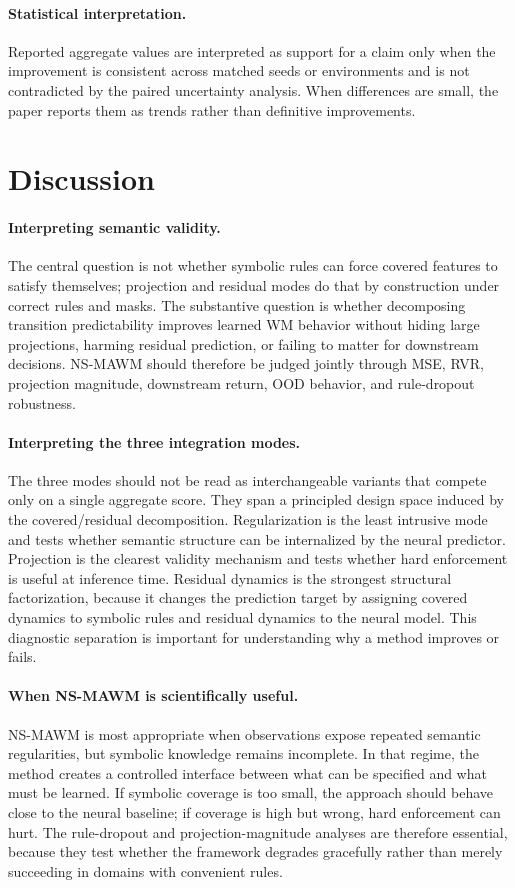 \documentclass{article}
\theoremstyle{plain}
\theoremstyle{definition}
\theoremstyle{remark}
\begin{document}
\paragraph{Statistical interpretation.}
Reported aggregate values are interpreted as support for a claim only when the improvement is consistent across matched seeds or environments and is not contradicted by the paired uncertainty analysis. When differences are small, the paper reports them as trends rather than definitive improvements.

\section{Discussion}
\label{sec:discussion}

\paragraph{Interpreting semantic validity.}
The central question is not whether symbolic rules can force covered features to satisfy themselves; projection and residual modes do that by construction under correct rules and masks. The substantive question is whether decomposing transition predictability improves learned WM behavior without hiding large projections, harming residual prediction, or failing to matter for downstream decisions. NS-MAWM should therefore be judged jointly through MSE, RVR, projection magnitude, downstream return, OOD behavior, and rule-dropout robustness.

\paragraph{Interpreting the three integration modes.}
The three modes should not be read as interchangeable variants that compete only on a single aggregate score. They span a principled design space induced by the covered/residual decomposition. Regularization is the least intrusive mode and tests whether semantic structure can be internalized by the neural predictor. Projection is the clearest validity mechanism and tests whether hard enforcement is useful at inference time. Residual dynamics is the strongest structural factorization, because it changes the prediction target by assigning covered dynamics to symbolic rules and residual dynamics to the neural model. This diagnostic separation is important for understanding why a method improves or fails.

\paragraph{When NS-MAWM is scientifically useful.}
NS-MAWM is most appropriate when observations expose repeated semantic regularities, but symbolic knowledge remains incomplete. In that regime, the method creates a controlled interface between what can be specified and what must be learned. If symbolic coverage is too small, the approach should behave close to the neural baseline; if coverage is high but wrong, hard enforcement can hurt. The rule-dropout and projection-magnitude analyses are therefore essential, because they test whether the framework degrades gracefully rather than merely succeeding in domains with convenient rules.
\end{document}
